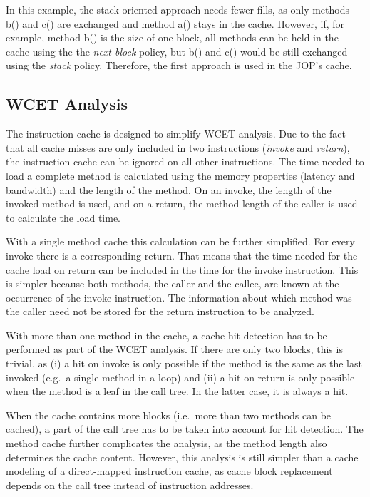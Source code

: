 In this example, the stack oriented approach needs fewer fills, as
only methods b() and c() are exchanged and method a() stays in the
cache. However, if, for example, method b() is the size of one block,
all methods can be held in the cache using the the \emph{next block}
policy, but b() and c() would be still exchanged using the
\emph{stack} policy. Therefore, the first approach is used in the
JOP's cache.


\subsection{WCET Analysis}

\label{sec:cache:wcet}

The instruction cache is designed to simplify WCET analysis. Due to
the fact that all cache misses are only included in two instructions
(\emph{invoke} and \emph{return}), the instruction cache can be
ignored on all other instructions. The time needed to load a complete
method is calculated using the memory properties (latency and
bandwidth) and the length of the method. On an invoke, the length of
the invoked method is used, and on a return, the method length of the
caller is used to calculate the load time.

With a single method cache this calculation can be further
simplified. For every invoke there is a corresponding return. That
means that the time needed for the cache load on return can be
included in the time for the invoke instruction. This is simpler
because both methods, the caller and the callee, are known at the
occurrence of the invoke instruction. The information about which
method was the caller need not be stored for the return instruction
to be analyzed.

With more than one method in the cache, a cache hit detection has to
be performed as part of the WCET analysis. If there are only two
blocks, this is trivial, as (i) a hit on invoke is only possible if
the method is the same as the last invoked (e.g.\ a single method in
a loop) and (ii) a hit on return is only possible when the method is
a leaf in the call tree. In the latter case, it is always a hit.

When the cache contains more blocks (i.e.\ more than two methods can
be cached), a part of the call tree has to be taken into account for
hit detection. The method cache further complicates the analysis, as
the method length also determines the cache content. However, this
analysis is still simpler than a cache modeling of a direct-mapped
instruction cache, as cache block replacement depends on the call
tree instead of instruction addresses.

